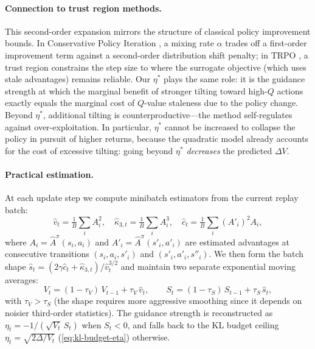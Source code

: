 \documentclass{article}
\theoremstyle{plain}
\theoremstyle{definition}
\theoremstyle{remark}
\begin{document}
\paragraph{Connection to trust region methods.}
This second-order expansion mirrors the structure of classical policy improvement bounds.
In Conservative Policy Iteration \citep{kakade2002approximately}, a mixing rate $\alpha$ trades off a first-order improvement term against a second-order distribution shift penalty; in TRPO \citep{schulman2015trust}, a trust region constrains the step size to where the surrogate objective (which uses stale advantages) remains reliable.
Our $\eta^*$ plays the same role: it is the guidance strength at which the marginal benefit of stronger tilting toward high-$Q$ actions exactly equals the marginal cost of $Q$-value staleness due to the policy change.
Beyond $\eta^*$, additional tilting is counterproductive---the method self-regulates against over-exploitation.
In particular, $\eta^*$ cannot be increased to collapse the policy in pursuit of higher returns, because the quadratic model already accounts for the cost of excessive tilting: going beyond $\eta^*$ \emph{decreases} the predicted $\Delta V$.

\paragraph{Practical estimation.}
At each update step we compute minibatch estimators from the current replay batch:
\begin{equation}
  \hat{v}_t = \tfrac{1}{B}\textstyle\sum_i A_i^2, \quad
  \hat{\kappa}_{3,t} = \tfrac{1}{B}\textstyle\sum_i A_i^3, \quad
  \hat{c}_t = \tfrac{1}{B}\textstyle\sum_i (A'_i)^2 A_i,
\end{equation}
where $A_i = \hat{A}^\pi(s_i,a_i)$ and $A'_i = \hat{A}^\pi(s'_i,a'_i)$ are estimated advantages at consecutive transitions $(s_i,a_i,s'_i)$ and $(s'_i,a'_i,s''_i)$.
We then form the batch shape $\hat{s}_t = (2\gamma \hat{c}_t + \hat{\kappa}_{3,t}) / \hat{v}_t^{3/2}$ and maintain two separate exponential moving averages:
\begin{equation}
  V_t = (1-\tau_V)\, V_{t-1} + \tau_V\, \hat{v}_t, \qquad
  S_t = (1-\tau_S)\, S_{t-1} + \tau_S\, \hat{s}_t,
\end{equation}
with $\tau_V > \tau_S$ (the shape requires more aggressive smoothing since it depends on noisier third-order statistics).
The guidance strength is reconstructed as $\eta_t = -1/(\sqrt{V_t}\, S_t)$ when $S_t < 0$, and falls back to the KL budget ceiling $\eta_t = \sqrt{2\Delta / V_t}$ (\cref{eq:kl-budget-eta}) otherwise.
\end{document}
